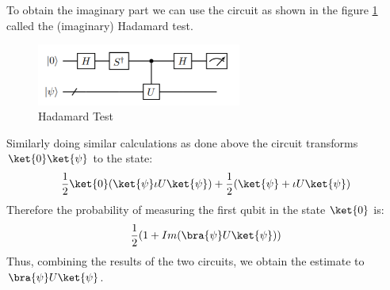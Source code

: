 \documentclass[12pt, oneside]{book}
\theoremstyle{definition}
\theoremstyle{definition}
\theoremstyle{remark}
\begin{document}
To obtain the imaginary part we can use the circuit as shown in the figure \ref{Hadamardtest1} called
the (imaginary) Hadamard test.
\begin{figure}[H]
    \centering
    \includegraphics[width=0.6\textwidth]{../images/hadamardtest1.png}
    \caption{Hadamard Test}
    \label{Hadamardtest1}
\end{figure}
Similarly doing similar calculations as done above the circuit transforms $\ket{0}\ket{\psi}$ to the state:
\[
\frac{1}{2}\ket{0}(\ket{\psi}\iota U\ket{\psi})+\frac{1}{2}(\ket{\psi}+\iota U\ket{\psi})
\]
Therefore the probability of measuring the first qubit in the state $\ket{0}$ is:
\[
\frac{1}{2}(1+Im(\bra{\psi}U\ket{\psi}))
\]
Thus, combining the results of the two circuits, we obtain the estimate to $\bra{\psi}U\ket{\psi}$.
\end{document}
